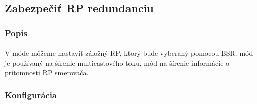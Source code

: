 \documentclass[12pt,twoside,a4paper]{report}
\begin{document}
\subsection{Zabezpečiť RP redundanciu}
\subsubsection{Popis}
\paragraph{}
V  móde môžeme nastaviť záložný RP, ktorý bude vyberaný pomocou BSR.  mód je používaný na šírenie multicastového toku,  mód na šírenie informácie o prítomnosti RP smerovača.

\subsubsection{Konfigurácia}
\end{document}
